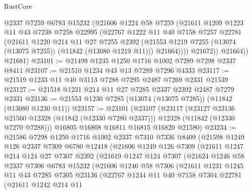 \begin{lexlean}{RustCore}
\begin{coremodule}
              @2337
              @7259
              @6783
              @15232
              (@21606
                @1224
                @58
                @7259
                (@21611
                  @1209
                  @1223
                  @11
                  @43
                  @7238
                  @7258
                  @22995
                  (@22767
                    @1222
                    @11
                    @40
                    @7158
                    @7257
                    @22781
                    (@21611
                      @1220
                      @214
                      @11
                      @27
                      @7255
                      @2392
                      (@21553 @1219 @7255 (@13074 (@13075 @7255)) (@11842 (@13080 @1219 @11)))
                      @21664))))
              @21672))
          @21664))
      @21681)
@23101 := @21499 @1235 @1250 @1716 @1002 @7289 @7298 @2337 @8411
@23107 := @21510 @1234 @43 @13 @7289 @7296 @4333
@23117 := @21519 @1233 @11 @40 @3113 @7288 @7295 @2487 @7269 @2331 @21539
@23127 := @21518 @1231 @214 @11 @27 @7285 @2337 @2392 @2487 @7279 @2331
@23136 := @21553 @1230 @7285 (@13074 (@13075 @7285)) (@11842 (@13080 @1230 @11))
@23157 := @23101
    (@23107
      (@23117
        (@23127 @23136 @21560 @12328 (@11842 (@12330 @7280 @2337)))
        @12328
        (@11842 (@12330 @7270 @7288)))
      @16805
      @16808
      @16811
      @16815
      @16820
      @21580)
@23234 := @21586
    @7298
    @1250
    @1716
    @1002
    @2337
    @7310
    @7336
    @8409
    (@21598
      @1249
      @126
      @2337
      @7309
      @6780
      @12418
      (@21606
        @1249
        @126
        @7309
        (@21611
          @1247
          @214
          @124
          @27
          @7307
          @2392
          (@21619
            @1247
            @124
            @7307
            (@21624
              @1246
              @58
              @2337
              @7306
              @6783
              @15232
              (@21606
                @1246
                @58
                @7306
                (@21611
                  @1231
                  @1245
                  @11
                  @43
                  @7285
                  @7305
                  @23136
                  (@22767
                    @1244
                    @11
                    @40
                    @7158
                    @7304
                    @22781
                    (@21611
                      @1242
                      @214
                      @11

\end{coremodule}
\end{lexlean}
